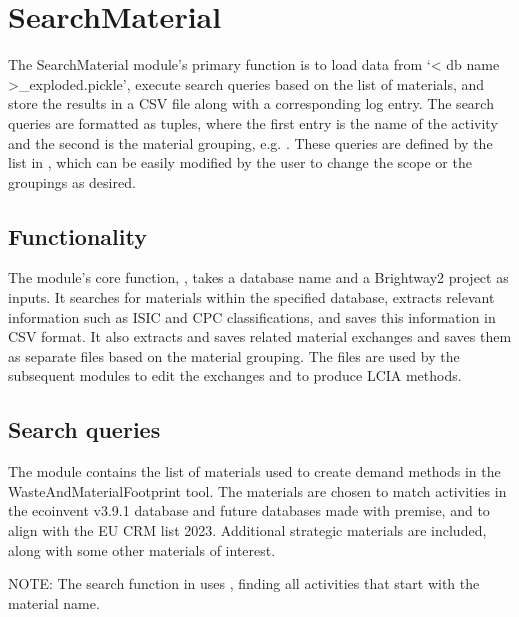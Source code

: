 \documentclass[letterpaper,10pt,english]{sphinxmanual}
\begin{document}
\sphinxstepscope


\section{SearchMaterial}
\label{\detokenize{SearchMaterial:searchmaterial}}\label{\detokenize{SearchMaterial::doc}}
\sphinxAtStartPar
The SearchMaterial module’s primary function is to load data from ‘\textless{} db name \textgreater{}\_exploded.pickle’, execute search queries based on the list of materials, and store the results in a CSV file along with a corresponding log entry. The search queries are formatted as tuples, where the first entry is the name of the activity and the second is the material grouping, e.g. . These queries are defined by the list in , which can be easily modified by the user to change the scope or the groupings as desired.


\subsection{Functionality}
\label{\detokenize{SearchMaterial:functionality}}
\sphinxAtStartPar
The module’s core function, , takes a database name and a Brightway2 project as inputs. It
searches for materials within the specified database, extracts relevant information such as ISIC and CPC
classifications, and saves this information in CSV format. It also extracts and saves related material exchanges and saves them as separate files based on the material grouping. The files are used by the subsequent modules to edit the exchanges and to produce LCIA methods.


\subsection{Search queries}
\label{\detokenize{SearchMaterial:search-queries}}
\sphinxAtStartPar
The module  contains the list of materials used to create demand methods in the WasteAndMaterialFootprint tool.
The materials are chosen to match activities in the ecoinvent v3.9.1 database and future databases made with
premise, and to align with the EU CRM list 2023. Additional strategic materials are included, along with some other
materials of interest.

\sphinxAtStartPar
NOTE: The search function in  uses , finding all activities that start with the material name.
\end{document}
